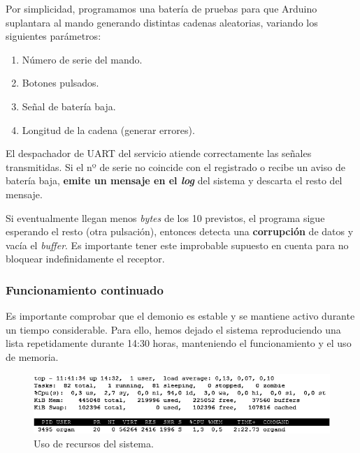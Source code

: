 \smallskip

Por simplicidad, programamos una batería de pruebas para que Arduino suplantara al mando generando distintas cadenas aleatorias, variando los siguientes parámetros:

\begin{enumerate}
	\item Número de serie del mando.
	\item Botones pulsados.
	\item Señal de batería baja.
	\item Longitud de la cadena (generar errores).
\end{enumerate}

El despachador de \acrshort{UART} del servicio atiende correctamente las señales transmitidas. Si el nº de serie no coincide con el registrado o recibe un aviso de batería baja, \textbf{emite un mensaje en el \textit{log}} del sistema y descarta el resto del mensaje.

Si eventualmente llegan menos \textit{bytes} de los 10 previstos, el programa sigue esperando el resto (otra pulsación), entonces detecta una \textbf{corrupción} de datos y vacía el \textit{buffer}. Es importante tener este improbable supuesto en cuenta para no bloquear indefinidamente el receptor.

\subsubsection{Funcionamiento continuado}

Es importante comprobar que el demonio es estable y se mantiene activo durante un tiempo considerable. Para ello, hemos dejado el sistema reproduciendo una lista repetidamente durante 14:30 horas, manteniendo el funcionamiento y el uso de memoria.

\smallskip

\begin{figure}[H]
	\noindent \begin{centering}
		\includegraphics[width=\linewidth*3/4]{capitulo6/cap_top}
		\par\end{centering}
	\smallskip
	\caption{\label{fig:cap_top} Uso de recursos del sistema.}
\end{figure} 

